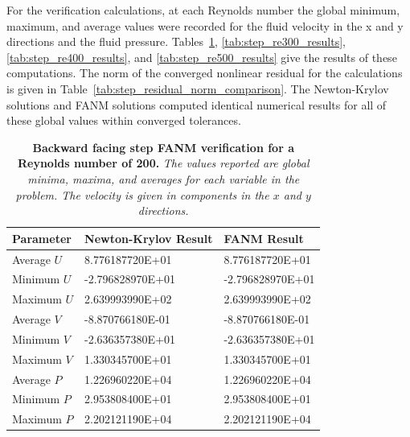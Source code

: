For the verification calculations, at each Reynolds number the global
minimum, maximum, and average values were recorded for the fluid
velocity in the x and y directions and the fluid
pressure. Tables~\ref{tab:step_re200_results},
\ref{tab:step_re300_results}, \ref{tab:step_re400_results}, and
\ref{tab:step_re500_results} give the results of these computations.
The norm of the converged nonlinear residual for the calculations is
given in Table~\ref{tab:step_residual_norm_comparison}. The
Newton-Krylov solutions and FANM solutions computed identical
numerical results for all of these global values within converged
tolerances.

\begin{table}[h!]
  \begin{center}
    \begin{tabular}{lll}\hline\hline
      \multicolumn{1}{l}{Parameter}& 
      \multicolumn{1}{l}{Newton-Krylov Result}&
      \multicolumn{1}{l}{FANM Result}\\
      \hline
      Average $U$ & 8.776187720E+01 & 8.776187720E+01 \\
      Minimum $U$ & -2.796828970E+01 & -2.796828970E+01 \\
      Maximum $U$ & 2.639993990E+02 & 2.639993990E+02 \\
      \hline
      Average $V$ & -8.870766180E-01 & -8.870766180E-01 \\
      Minimum $V$ & -2.636357380E+01 & -2.636357380E+01 \\
      Maximum $V$ & 1.330345700E+01 & 1.330345700E+01 \\
      \hline
      Average $P$ & 1.226960220E+04 & 1.226960220E+04 \\ 
      Minimum $P$ & 2.953808400E+01 & 2.953808400E+01 \\ 
      Maximum $P$ & 2.202121190E+04 & 2.202121190E+04 \\ 
      \hline\hline
    \end{tabular}
  \end{center}
  \caption{\textbf{Backward facing step FANM verification for a
      Reynolds number of 200.} \textit{The values reported are global
      minima, maxima, and averages for each variable in the
      problem. The velocity is given in components in the $x$ and $y$
      directions.}}
  \label{tab:step_re200_results}
\end{table}

